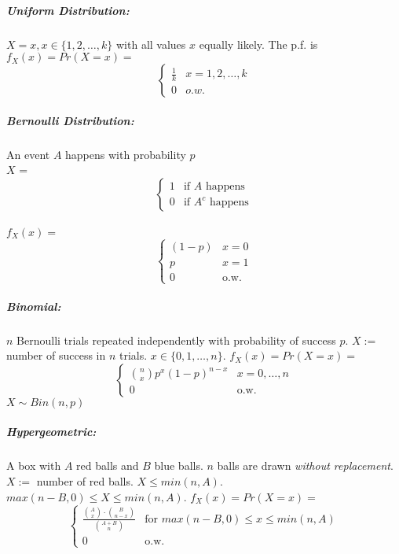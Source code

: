 \documentclass[landscape,10pt]{article}
\begin{document}
\begin{multicols}{3}
            \subparagraph*{Uniform Distribution: }
                $X = x, x \in \{1, 2, \ldots, k\}$ with all values $x$ equally likely. The p.f. is $f_X(x) = Pr(X=x) = $\[ \begin{cases} \frac      {1}{k} & x = 1, 2, \ldots, k \\
                0 & o.w. \end{cases}
                    \]
            \subparagraph*{Bernoulli Distribution: }
                An event $A$ happens with probability $p$ \\
            $X$ = \[ \begin{cases} 1 & \text{if $A$ happens} \\ 0 & \text{if $A^c$ happens} \end{cases} \] \\
                $f_X(x) =$ \[ 
                    \begin{cases} 
                        (1-p)   & x = 0 \\ 
                        p       & x = 1 \\
                        0       & \text{o.w.} 
                    \end{cases} \]
            \subparagraph*{Binomial:}
                    $n$ Bernoulli trials repeated independently with probability of success $p$. $X :=$ number of success in $n$ trials. $x \in \{0, 1, \ldots, n\}$. $f_X(x) = Pr(X=x) =$
                    \[
                        \begin{cases}
                            {n \choose x} p^x (1-p)^{n-x}   &   x=0, \ldots, n \\
                            0                               &   \text{o.w.}
                        \end{cases}
                        \]
                        $X \sim Bin(n,p)$
            \subparagraph*{Hypergeometric: }
                    A box with $A$ red balls and $B$ blue balls. $n$ balls are drawn \textit{without replacement}. $X :=$ number of red balls. $X \leq min(n, A)$. $max(n-B, 0) \leq X \leq min(n,A)$. $f_X(x) = Pr(X=x) =$ \[
                        \begin{cases}
                            \frac{ {A \choose x} \cdot {B \choose n - x}}{{A + B \choose n}}     &   \text{for } max(n-B,0) \leq x \leq min(n,A) \\
                            0   &   \text{o.w.}
                        \end{cases}
                    \]
            

\end{multicols}
\end{document}
